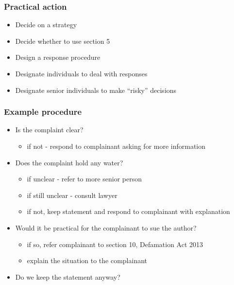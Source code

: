 \documentclass[ignorenonframetext,]{beamer}
\begin{document}
\begin{frame}
  \frametitle{Practical action}
  \begin{itemize}
  \item Decide on a strategy
  \item Decide whether to use section 5
  \item Design a response procedure
  \item Designate individuals to deal with responses
  \item Designate senior individuals to make ``risky'' decisions
  \end{itemize}
\end{frame}

\begin{frame}
  \frametitle{Example procedure}
  \begin{itemize}
  \item Is the complaint clear?
    \begin{itemize}
    \item if not - respond to complainant asking for more information
    \end{itemize}
  \item Does the complaint hold any water?
    \begin{itemize}
    \item if unclear - refer to more senior person
    \item if still unclear - consult lawyer
    \item if not, keep statement and respond to complainant with explanation
    \end{itemize}
  \item Would it be practical for the complainant to sue the author?
    \begin{itemize}
    \item if so, refer complainant to section 10, Defamation Act 2013
    \item explain the situation to the complainant
    \end{itemize}
  \item Do we keep the statement anyway?
  \end{itemize}

\end{frame}
\end{document}
